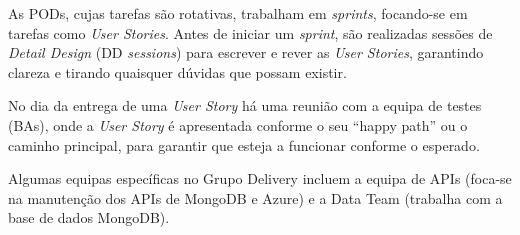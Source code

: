                 As PODs, cujas tarefas são rotativas, trabalham em \textit{sprints}, focando-se em tarefas como \textit{User Stories}. Antes de iniciar um \textit{sprint}, são realizadas sessões de \textit{Detail Design} (DD \textit{sessions}) para escrever e rever as \textit{User Stories}, garantindo clareza e tirando quaisquer dúvidas que possam existir.
                
                No dia da entrega de uma \textit{User Story} há uma reunião com a equipa de testes (BAs), onde a \textit{User Story} é apresentada conforme o seu ``happy path'' ou o caminho principal, para garantir que esteja a funcionar conforme o esperado.
                
                Algumas equipas específicas no Grupo Delivery incluem a equipa de APIs (foca-se na manutenção dos APIs de MongoDB e Azure) e a Data Team (trabalha com a base de dados MongoDB).
